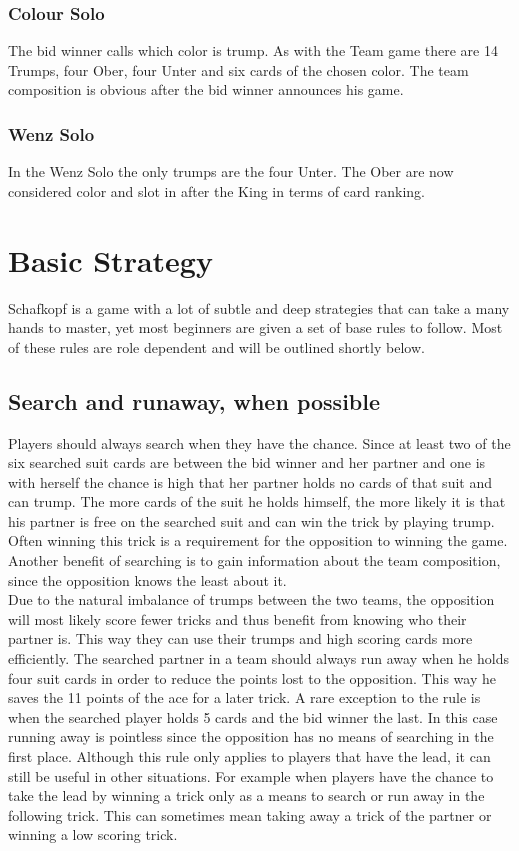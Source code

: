 \subsubsection{Colour Solo}
The bid winner calls which color is trump.
As with the Team game there are 14 Trumps, four Ober, four Unter and six cards of the chosen color.
The team composition is obvious after the bid winner announces his game.

\subsubsection{Wenz Solo}
In the Wenz Solo the only trumps are the four Unter.
The Ober are now considered color and slot in after the King in terms of card ranking.


\section{Basic Strategy}\label{basicstrategy}
Schafkopf is a game with a lot of subtle and deep strategies that can take a many hands to master, yet most beginners
are given a set of base rules to follow.
Most of these rules are role dependent and will be outlined shortly below.

\subsection{Search and runaway, when possible}
Players should always search when they have the chance.
Since at least two of the six searched suit cards are between the bid winner and her partner and one is with herself
the chance is high that her partner holds no cards of that suit and can trump.
The more cards of the suit he holds himself, the more likely it is that his partner is free on the searched suit and
can win the trick by playing trump.
Often winning this trick is a requirement for the opposition to winning the game.
Another benefit of searching is to gain information about the team composition, since the opposition knows the least
about it.\\
Due to the natural imbalance of trumps between the two teams, the opposition will most likely score fewer tricks and
thus benefit from knowing who their partner is.
This way they can use their trumps and high scoring cards more efficiently.
\newline
The searched partner in a team should always run away when he holds four suit cards in order to reduce the points lost
to the opposition.
This way he saves the 11 points of the ace for a later trick.
A rare exception to the rule is when the searched player holds 5 cards and the bid winner the last.
In this case running away is pointless since the opposition has no means of searching in the first place.
\newline
Although this rule only applies to players that have the lead, it can still be useful in other situations.
For example when players have the chance to take the lead by winning a trick only as a means to search or run away in
the following trick.
This can sometimes mean taking away a trick of the partner or winning a low scoring trick.

